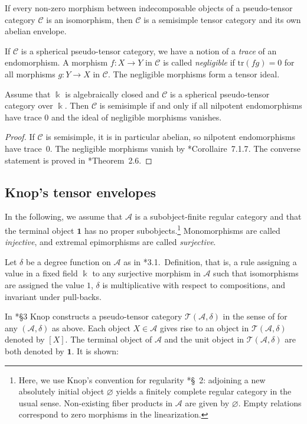 \documentclass[11pt]{amsart}
\newcommand\Cref[1]{\zcref[S]{#1}}
\theoremstyle{definition}
\theoremstyle{remark}
\newcommand\cA{\mathcal A}
\newcommand\cC{\mathcal C}
\newcommand\cT{\mathcal T}
\newcommand\kk{\Bbbk}
\renewcommand\:\colon
\newcommand\one{\mathbf{1}}
\renewcommand\:\colon
\begin{document}
If every non-zero morphism between indecomposable objects of a pseudo-tensor category $\cC$ is an isomorphism, then $\cC$ is a semisimple tensor category and its own abelian envelope.

If $\cC$ is a spherical pseudo-tensor category, we have a notion of a \emph{trace} of an endomorphism. A morphism $f: X \to Y$ in $\cC$ is called \emph{negligible} if $\mathrm{tr}(fg) = 0$ for all morphisms $g: Y \to X$ in $\cC$. The negligible morphisms form a tensor ideal.

\begin{proposition} \label{p:semisimplification}
    Assume that $\kk$ is algebraically closed and $\cC$ is a spherical pseudo-tensor category over $\kk$. Then $\cC$ is semisimple if and only if all nilpotent endomorphisms have trace 0 and the ideal of negligible morphisms vanishes.
\end{proposition}
\begin{proof}
    If $\cC$ is semisimple, it is in particular abelian, so nilpotent endomorphisms have trace~0. The negligible morphisms vanish by \cite{ssnegligibles}*{Corollaire~7.1.7}. The converse statement is proved in \cite{onsemisimplification}*{Theorem~2.6}.
\end{proof}

\subsection{Knop's tensor envelopes} \label{bg:knop}

In the following, we assume that $\cA$ is a subobject-finite regular category and that the terminal object $\one$ has no proper subobjects.\footnote{Here, we use Knop's convention for regularity \cite{knop}*{\S~2}: adjoining a new absolutely initial object $\varnothing$ yields a finitely complete regular category in the usual sense. Non-existing fiber products in $\cA$ are given by $\varnothing$. Empty relations correspond to zero morphisms in the linearization.} Monomorphisms are called \emph{injective}, and extremal epimorphisms are called \emph{surjective}.

Let $\delta$ be a degree function on $\cA$ as in \cite{knop}*{3.1.~Definition}, that is, a rule assigning a value in a fixed field $\kk$ to any surjective morphism in $\cA$ such that isomorphisms are assigned the value $1$, $\delta$ is multiplicative with respect to compositions, and invariant under pull-backs.

In \cite{knop}*{\S 3} Knop constructs a pseudo-tensor category $\cT(\cA,\delta)$ in the sense of \Cref{bg:tensorcat} for any $(\cA,\delta)$ as above. Each object $X \in \cA$ gives rise to an object in $\cT(\cA, \delta)$ denoted by $[X]$. The terminal object of $\cA$ and the unit object in $\cT(\cA, \delta)$ are both denoted by $\one$. It is shown:
\end{document}
